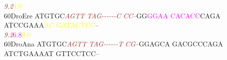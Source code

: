 \documentclass[11pt,twoside,reqno,a4paper]{article}
\begin{document}
{\hspace*{4\charwidth}\hspace*{7\charwidth}\hspace*{6\charwidth}\textit{\textcolor{brown}{9.2}}\hspace*{1\charwidth}\hspace*{1\charwidth}\hspace*{1\charwidth}\hspace*{1\charwidth}\hspace*{39\charwidth}\textcolor{yellow}{9.0}\hspace*{1\charwidth}\hspace*{1\charwidth}\\
60\hspace*{2\charwidth}DroEre	ATGTGC\textit{\textcolor{brown}{A}}\textit{\textcolor{brown}{G}}\textit{\textcolor{brown}{T}}\textit{\textcolor{brown}{T}}	\textit{\textcolor{brown}{T}}\textit{\textcolor{brown}{A}}\textit{\textcolor{brown}{G}}\textit{\textcolor{brown}{-}}\textit{\textcolor{brown}{-}}\textit{\textcolor{brown}{-}}\textit{\textcolor{brown}{-}}\textit{\textcolor{brown}{-}}\textit{\textcolor{brown}{-}}\textit{\textcolor{brown}{C}}	\textit{\textcolor{brown}{C}}\textit{\textcolor{brown}{C}}--GG\textcolor{magenta}{G}\textcolor{magenta}{G}\textcolor{magenta}{A}\textcolor{magenta}{A}	\textcolor{magenta}{C}\textcolor{magenta}{A}\textcolor{magenta}{C}\textcolor{magenta}{A}\textcolor{magenta}{C}\textcolor{magenta}{C}CAGA	ATCCGAAA\textcolor{yellow}{A}\textcolor{yellow}{C}	\textcolor{yellow}{G}\textcolor{yellow}{A}\textcolor{yellow}{T}\textcolor{yellow}{A}\textcolor{yellow}{C}\textcolor{yellow}{T}\textcolor{yellow}{C}\textcolor{yellow}{C}--	\\
\hspace*{4\charwidth}\hspace*{7\charwidth}\hspace*{6\charwidth}\textit{\textcolor{brown}{9.2}}\hspace*{1\charwidth}\hspace*{1\charwidth}\hspace*{17\charwidth}\textcolor{magenta}{6.8}\hspace*{1\charwidth}\hspace*{1\charwidth}\hspace*{19\charwidth}\textcolor{yellow}{9.0}\hspace*{1\charwidth}\hspace*{1\charwidth}\\
60\hspace*{2\charwidth}DroAna	ATGTGC\textit{\textcolor{brown}{A}}\textit{\textcolor{brown}{G}}\textit{\textcolor{brown}{T}}\textit{\textcolor{brown}{T}}	\textit{\textcolor{brown}{T}}\textit{\textcolor{brown}{A}}\textit{\textcolor{brown}{G}}\textit{\textcolor{brown}{-}}\textit{\textcolor{brown}{-}}\textit{\textcolor{brown}{-}}\textit{\textcolor{brown}{-}}\textit{\textcolor{brown}{-}}\textit{\textcolor{brown}{-}}\textit{\textcolor{brown}{T}}	\textit{\textcolor{brown}{C}}\textit{\textcolor{brown}{G}}--GGAGCA	GACGCCCAGA	ATCTGAAAAT	GTTCCTCC--	\\
}
\end{document}
